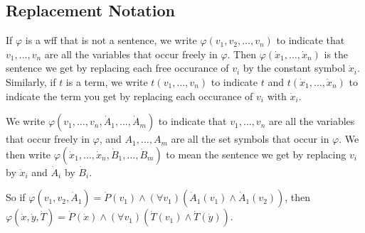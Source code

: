 \subsection{Replacement Notation}
If $\varphi$ is a wff that is not a sentence, we write $\varphi(v_1, v_2, \ldots, v_n)$ to indicate that $v_1, \ldots, v_n$ are all the variables that occur freely in $\varphi$. Then $\varphi(\dot x_1, \ldots, \dot x_n)$ is the sentence we get by replacing each free occurance of $v_i$ by the constant symbol $\dot x_i$. Similarly, if $t$ is a term, we write $t(v_1, \ldots, v_n)$ to indicate $t$ and $t(\dot x_1, \ldots, \dot x_n)$ to indicate the term you get by replacing each occurance of $v_i$ with $\dot x_i$.

We write $\varphi(v_1, \ldots, v_n, \dot A_1, \ldots, \dot A_m)$ to indicate that $v_1, \ldots, v_n$ are all the variables that occur freely in $\varphi$, and $A_1, \ldots, A_m$ are all the set symbols that occur in $\varphi$. We then write $\varphi(\dot x_1, \ldots, \dot x_n, \dot B_1, \ldots, \dot B_m)$ to mean the sentence we get by replacing $v_i$ by $\dot x_i$ and $\dot A_i$ by $\dot B_i$.

So if $\varphi(v_1, v_2, \dot A_1) = \dot P(v_1) \land (\forall v_1)(\dot A_1(v_1) \land \dot A_1(v_2))$, then $\varphi(\dot x, \dot y, \dot T) = \dot P(\dot x) \land (\forall v_1)(\dot T(v_1) \land \dot T(\dot y))$.

